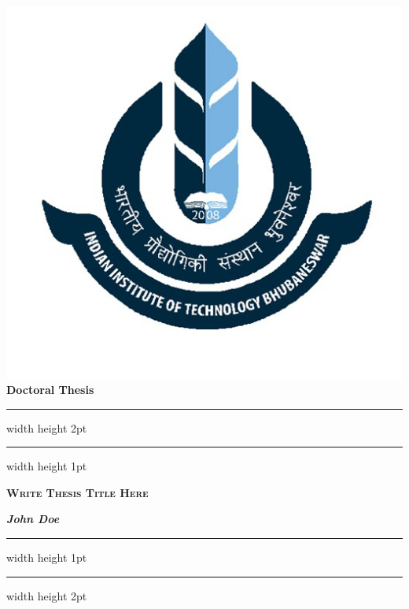 
\begin{center}
\includegraphics[scale=0.3]{iitbbs}\\
{\selectfont
\Huge \bfseries Doctoral Thesis}\\
\vspace*{1cm}
{\hrule width \hsize height 2pt \kern 1mm \hrule width \hsize height 1pt}

\vspace*{0.25cm}
{\huge \bfseries \scshape Write Thesis Title Here}
\vspace*{\fill}
\begin{flushright}
{\LARGE \bfseries \itshape John Doe}
\end{flushright}
\vspace*{0.25cm}

{\hrule width \hsize height 1pt \kern 1mm \hrule width \hsize height 2pt}

\end{center}

\newpage\null\newpage
